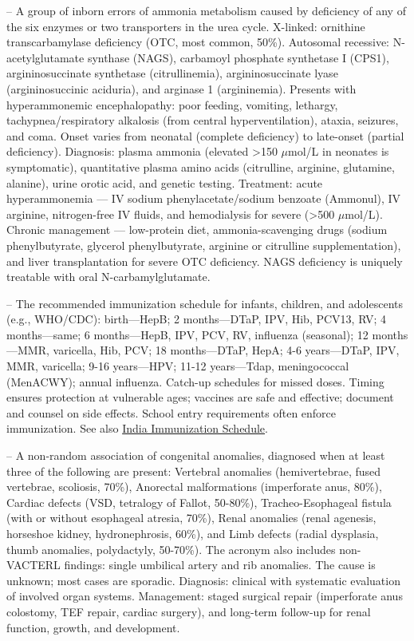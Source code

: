 -- A group of inborn errors of ammonia metabolism caused by deficiency of any of the six enzymes or two transporters in the urea cycle. X-linked: ornithine transcarbamylase deficiency (OTC, most common, 50\%). Autosomal recessive: N-acetylglutamate synthase (NAGS), carbamoyl phosphate synthetase I (CPS1), argininosuccinate synthetase (citrullinemia), argininosuccinate lyase (argininosuccinic aciduria), and arginase 1 (argininemia). Presents with hyperammonemic encephalopathy: poor feeding, vomiting, lethargy, tachypnea/respiratory alkalosis (from central hyperventilation), ataxia, seizures, and coma. Onset varies from neonatal (complete deficiency) to late-onset (partial deficiency). Diagnosis: plasma ammonia (elevated >150 \(\mu\)mol/L in neonates is symptomatic), quantitative plasma amino acids (citrulline, arginine, glutamine, alanine), urine orotic acid, and genetic testing. Treatment: acute hyperammonemia — IV sodium phenylacetate/sodium benzoate (Ammonul), IV arginine, nitrogen-free IV fluids, and hemodialysis for severe (>500 \(\mu\)mol/L). Chronic management — low-protein diet, ammonia-scavenging drugs (sodium phenylbutyrate, glycerol phenylbutyrate, arginine or citrulline supplementation), and liver transplantation for severe OTC deficiency. NAGS deficiency is uniquely treatable with oral N-carbamylglutamate.

-- The recommended immunization schedule for infants, children, and adolescents (e.g., WHO/CDC): birth—HepB; 2 months—DTaP, IPV, Hib, PCV13, RV; 4 months—same; 6 months—HepB, IPV, PCV, RV, influenza (seasonal); 12 months—MMR, varicella, Hib, PCV; 18 months—DTaP, HepA; 4-6 years—DTaP, IPV, MMR, varicella; 9-16 years—HPV; 11-12 years—Tdap, meningococcal (MenACWY); annual influenza. Catch-up schedules for missed doses. Timing ensures protection at vulnerable ages; vaccines are safe and effective; document and counsel on side effects. School entry requirements often enforce immunization. See also \hyperlink{India Immunization Schedule}{India Immunization Schedule}.

-- A non-random association of congenital anomalies, diagnosed when at least three of the following are present: Vertebral anomalies (hemivertebrae, fused vertebrae, scoliosis, 70\%), Anorectal malformations (imperforate anus, 80\%), Cardiac defects (VSD, tetralogy of Fallot, 50-80\%), Tracheo-Esophageal fistula (with or without esophageal atresia, 70\%), Renal anomalies (renal agenesis, horseshoe kidney, hydronephrosis, 60\%), and Limb defects (radial dysplasia, thumb anomalies, polydactyly, 50-70\%). The acronym also includes non-VACTERL findings: single umbilical artery and rib anomalies. The cause is unknown; most cases are sporadic. Diagnosis: clinical with systematic evaluation of involved organ systems. Management: staged surgical repair (imperforate anus colostomy, TEF repair, cardiac surgery), and long-term follow-up for renal function, growth, and development.


